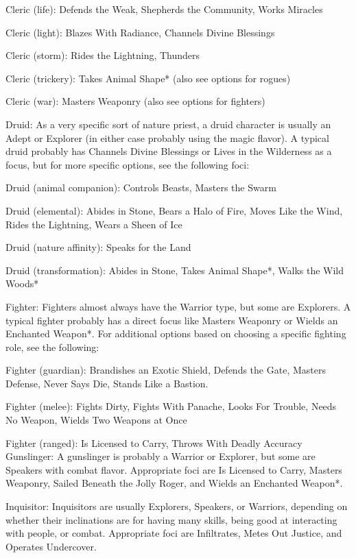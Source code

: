 Cleric (life): Defends the Weak, Shepherds the Community, Works Miracles

Cleric (light): Blazes With Radiance, Channels Divine Blessings 

Cleric (storm): Rides the Lightning, Thunders 

Cleric (trickery): Takes Animal Shape* (also see options for rogues)

Cleric (war): Masters Weaponry (also see options for fighters)

Druid: As a very specific sort of nature priest, a druid character is usually an Adept or Explorer (in either case probably using the magic flavor). A typical druid probably has Channels Divine Blessings or Lives in the Wilderness as a focus, but for more specific options, see the following foci: 

Druid (animal companion): Controls Beasts, Masters the Swarm 

Druid (elemental): Abides in Stone, Bears a Halo of Fire, Moves Like the Wind, Rides the Lightning, Wears a Sheen of Ice 

Druid (nature affinity): Speaks for the Land 

Druid (transformation): Abides in Stone, Takes Animal Shape*, Walks the Wild Woods*

Fighter: Fighters almost always have the Warrior type, but some are Explorers. A typical fighter probably has a direct focus like Masters Weaponry or Wields an Enchanted Weapon*. For additional options based on choosing a specific fighting role, see the following: 

Fighter (guardian): Brandishes an Exotic Shield, Defends the Gate, Masters Defense, Never Says Die, Stands Like a Bastion. 

Fighter (melee): Fights Dirty, Fights With Panache, Looks For Trouble, Needs No Weapon, Wields Two Weapons at Once 

Fighter (ranged): Is Licensed to Carry, Throws With Deadly Accuracy
Gunslinger: A gunslinger is probably a Warrior or Explorer, but some are Speakers with combat flavor. Appropriate foci are Is Licensed to Carry, Masters Weaponry, 
Sailed Beneath the Jolly Roger, and Wields an Enchanted Weapon*. 

Inquisitor: Inquisitors are usually Explorers, Speakers, or Warriors, depending on whether their inclinations are for having many skills, being good at interacting with people, or combat. Appropriate foci are Infiltrates, Metes Out Justice, and Operates Undercover. 

